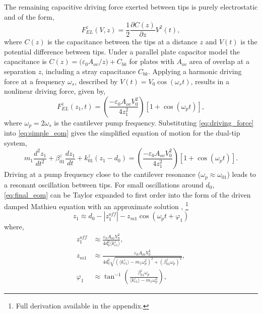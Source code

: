 \documentclass{article}
\begin{document}
The remaining capacitive driving force exerted between tips is purely electrostatic and of the form,
\begin{equation} F_{EL}^z(V,z) = \frac{1}{2} \frac{\partial C(z)}{\partial z} V^2(t), \end{equation}
where $C(z)$ is the capacitance between the tips at a distance $z$ and $V(t)$ is the potential difference between tips. Under a parallel plate capacitor model the capacitance is $C(z) = {(\varepsilon_0 A_{ov}}/{z}) + C_{bk}$ for plates with $A_{ov}$ area of overlap at a separation $z$, including a stray capacitance $C_{bk}$. Applying a harmonic driving force at a frequency $\omega_s$, described by $V(t)=V_0 \cos(\omega_s t)$, results in a nonlinear driving force, given by,
\begin{equation}
	F_{EL}^z(z_1,t) = \left(\frac{-\varepsilon_0 A_{ov} V_0^2}{4z_1^2}\right)\left[1+\cos(\omega_pt)\right],
	\label{eq:driving_force}
\end{equation}
where $\omega_p = 2\omega_s$ is the cantilever pump frequency.
Substituting \eqref{eq:driving_force} into \eqref{eq:simple_eom} gives the simplified equation of motion for the dual-tip system,
\begin{equation}
m_1 \frac{d^2z_1}{dt^2} + \beta_{01}^z \frac{dz_1}{dt} + k_{01}^z (z_1-d_0) = \left( \frac{-\varepsilon_0 A_{ov} V_0^2}{4z_1^2}\right)\left[1+\cos(\omega_pt)\right].
\label{eq:final_eom}
\end{equation}
Driving at a pump frequency close to the cantilever resonance ($\omega_p \approx \omega_{01}$) leads to a resonant oscillation between tips. For small oscillations around $d_0$, \eqref{eq:final_eom} can be Taylor expanded to first order into the form of the driven damped Mathieu equation with an approximate solution \cite{savage2012thesis},%
\footnote{Full derivation available in the appendix.}
\begin{equation}
z_1 \approx d_0 - \left|z_{1}^{off}\right| - z_{m1}\cos(\omega_pt+\varphi_1)
\label{eq:tip_oscillation}
\end{equation}
where,
\begin{subequations}
\begin{align}
z_1^{off} &\approx %
\frac{ \varepsilon_0 A_{ov} V_0^2 }{ 4d_0^2 \langle k_{e1}^z \rangle }, \\
%
z_{m1} &\approx %
\frac{ \varepsilon_0 A_{ov} V_0^2 }%
{ 4d_0^2 \sqrt{ (\langle k_{e1}^z \rangle - m_1\omega_p^2)^2 + (\beta_{01}^z\omega_p)^2  } }, \label{eq:tip_amp} \\
%
\varphi_1 &\approx \tan^{-1}\left(\frac{\beta_{01}^{z}\omega_{p}}{\langle k_{e1}^{z} \rangle -m_{1}\omega_{p}^{2}}\right), \label{eq:tip_phase}
\end{align}
\end{subequations}
\end{document}
